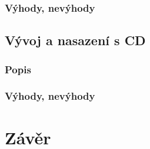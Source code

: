 \subsection{Výhody, nevýhody}

\section{Vývoj a nasazení s CD}

\subsection{Popis}

\subsection{Výhody, nevýhody}


\chapter{Závěr}


